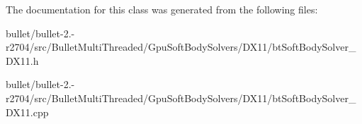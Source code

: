 The documentation for this class was generated from the following files\+:\begin{DoxyCompactItemize}
\item 
bullet/bullet-\/2.-\/r2704/src/\+Bullet\+Multi\+Threaded/\+Gpu\+Soft\+Body\+Solvers/\+D\+X11/bt\+Soft\+Body\+Solver\+\_\+\+D\+X11.\+h\item 
bullet/bullet-\/2.-\/r2704/src/\+Bullet\+Multi\+Threaded/\+Gpu\+Soft\+Body\+Solvers/\+D\+X11/bt\+Soft\+Body\+Solver\+\_\+\+D\+X11.\+cpp\end{DoxyCompactItemize}
